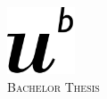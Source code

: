 \documentclass[
11pt, %
english, %
singlespacing, %
headsepline, %
]{MastersDoctoralThesis} %
\author{Joel \textsc{Niklaus}} %
\begin{document}
\newcommand{\keyword}[1]{\textbf{#1}}
\newcommand{\tabhead}[1]{\textbf{#1}}
\newcommand{\code}[1]{\texttt{#1}}
\newcommand{\file}[1]{\texttt{\bfseries#1}}
\newcommand{\option}[1]{\texttt{\itshape#1}}

\frontmatter %

\pagestyle{plain} %


\begin{titlepage}
\begin{center}

\vspace*{.06\textheight}
{\scshape\LARGE \univname\par}\vspace{0.5cm} %
\includegraphics[width=20mm]{Figures/UniversityCrest.png}\\[1.0cm] %
\textsc{\Large Bachelor Thesis}\\[0.5cm] %

\HRule \\[0.4cm] %
{\huge \bfseries \ttitle\par}\vspace{0.4cm} %
\HRule \\[1.5cm] %
 

\end{center}
\end{titlepage}
\end{document}
